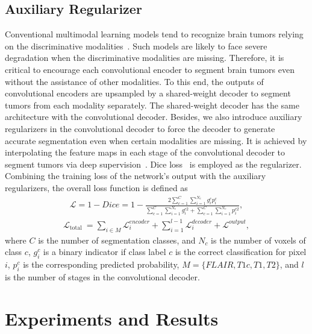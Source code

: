 \documentclass[runningheads]{llncs}
\begin{document}
\subsection{Auxiliary Regularizer}
Conventional multimodal learning models tend to recognize brain tumors relying on the discriminative modalities~\cite{chen2019robust,ding2021rfnet}. Such models are likely to face severe degradation when the discriminative modalities are missing. Therefore, it is critical to encourage each convolutional encoder to segment brain tumors even without the assistance of other modalities. To this end, the outputs of convolutional encoders are upsampled by a shared-weight decoder to segment tumors from each modality separately. The shared-weight decoder has the same architecture with the convolutional decoder. 
Besides, we also introduce auxiliary regularizers in the convolutional decoder to force the decoder to generate accurate segmentation even when certain modalities are missing. It is achieved by interpolating the feature maps in each stage of the convolutional decoder to segment tumors via deep supervision~\cite{dou20173d}. 
Dice loss~\cite{milletari2016v} is employed as the regularizer. Combining the training loss of the network's output with the auxiliary regularizers, the overall loss function is defined as
\begin{equation}
\label{eq:dice}
\begin{aligned}
	\mathcal{L}=1-Dice=1-\frac{2 \sum_{c=1}^{C} \sum_{i=1}^{N_c}  g_{i}^{c} p_{i}^{c}}{\sum_{c=1}^{C} \sum_{i=1}^{N_c} g_{i}^{c 2}+\sum_{c=1}^{C} \sum_{i=1}^{N_c} p_{i}^{c 2}},
\end{aligned}
\end{equation}
\begin{equation}
	\begin{aligned}
	    \mathcal{L}_{\text {total }} = \sum_{i\in M}\mathcal{L}^{encoder}_i + \sum^{l-1}_{i=1}\mathcal{L}^{decoder}_i + \mathcal{L}^{output},
	\end{aligned}
\end{equation}
where $C$ is the number of segmentation classes, and $N_c$ is the number of voxels of class $c$, $g_i^c$ is a binary indicator if class label $c$ is the correct classification for pixel $i$, $p_i^c$ is the corresponding predicted probability, $M=\{FLAIR, T1c, T1, T2\}$, and $l$ is the number of stages in the convolutional decoder.

\section{Experiments and Results}
\label{sec:exp}
\end{document}
